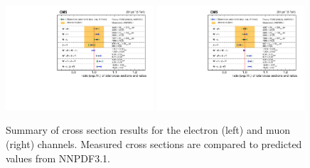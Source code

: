 \begin{figure}[htpb]
\includegraphics[width=0.49\textwidth]{plots/Results/xsecSummary5TeV_ele.pdf}
\includegraphics[width=0.49\textwidth]{plots/Results/xsecSummary5TeV_muon.pdf}
\caption{Summary of cross section results for the \serag electron (left) and muon (right) channels. Measured cross sections are compared to predicted values from NNPDF3.1.}
\label{fig:xs:5}
\end{figure}